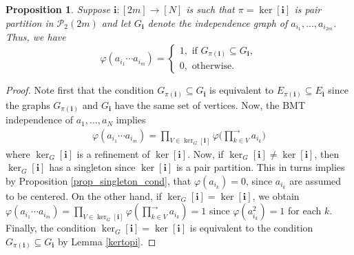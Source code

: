 \documentclass[a4paper,12pt]{extarticle}
\newtheorem{prop}[thm]{Proposition}
\theoremstyle{definition}
\theoremstyle{remark}
\begin{document}
\begin{prop}\label{prop_cerouno_ver2}
	Suppose  $\bm{i}: [2m] \to [N]$ is such that $\pi = \ker[\bm{i}]$ is pair partition in $\mathcal{P}_2(2m)$ and let $G_{\bm{i}}$ denote the independence graph of $a_{i_1},\ldots, a_{i_{2m}}$. 
	Thus, we have 
	\[
	\varphi(a_{i_1}\cdots a_{i_m})=\begin{cases}
		1,\text{ if } G_{\pi(\bm{i})} \subseteq  G_{\bm{i}}, \\
		0 ,\text{ otherwise.} 
	\end{cases}
	\] 
\end{prop}
%
\begin{proof}
	Note first that the condition $ G_{\pi(\bm{i})} \subseteq  G_{\bm{i}}$ is equivalent to $E_{\pi(\bm{i})} \subseteq  E_{\bm{i}}$ since the graphs $G_{\pi(\bm{i})}$ and $ G_{\bm{i}}$ have the same set of vertices. 
	Now, the BMT independence of $a_1,\ldots,a_N$ implies 
	\begin{eqnarray*}
		\varphi(a_{i_1}\cdots a_{i_m})=
		\prod_{V \in \ker_G[ \bm{i} ] } 
		\varphi \bigg( \prod_{k \in V}^{\rightarrow} a_{i_k} \bigg)  
	\end{eqnarray*}
	where $\ker_G[ \bm{i} ]$ is a refinement of $\ker[\bm{i}]$. 
Now, if $\ker_G[ \bm{i} ]\neq \ker[\bm{i}]$,    then $\ker_G[ \bm{i}]$ has a singleton since $\ker[\bm{i}]$ is a pair partition. This in turns implies by Proposition \ref{prop_singleton_cond}, that $\varphi(a_{i_k}) = 0$, since $a_{i_k}$ are assumed to be centered. On the other hand,  if $\ker_G[ \bm{i}]=\ker[\bm{i}]$, we obtain $\varphi(a_{i_1}\cdots a_{i_m}) = \prod_{V \in \ker_G[ \bm{i} ] } 
	\varphi ( \prod_{k \in V}^{\rightarrow} a_{i_k} ) =1$ since $\varphi(a^2_{i_k}) =1$ for each $k$. 
	Finally, the condition $\ker_G[ \bm{i}]=\ker[\bm{i}]$ is equivalent to the condition  $G_{\pi(\bm{i})} \subseteq  G_{\bm{i}}$ by Lemma \ref{kertopi}.
\end{proof}
\end{document}
